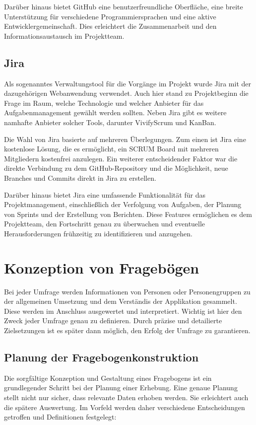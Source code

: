 Darüber hinaus bietet GitHub eine benutzerfreundliche Oberfläche, eine breite Unterstützung
für verschiedene Programmiersprachen und eine aktive Entwicklergemeinschaft. Dies erleichtert
die Zusammenarbeit und den Informationsaustausch im Projektteam.

\subsection{Jira}
Als sogenanntes Verwaltungstool für die Vorgänge im Projekt wurde Jira mit der dazugehörigen
Webanwendung verwendet. Auch hier stand zu Projektbeginn die Frage im Raum, welche Technologie
und welcher Anbieter für das Aufgabenmanagement gewählt werden sollten. Neben Jira gibt es
weitere namhafte Anbieter solcher Tools, darunter VivifyScrum und KanBan.

Die Wahl von Jira basierte auf mehreren Überlegungen. Zum einen ist Jira eine kostenlose
Lösung, die es ermöglicht, ein SCRUM Board mit mehreren Mitgliedern kostenfrei anzulegen.
Ein weiterer entscheidender Faktor war die direkte Verbindung zu dem GitHub-Repository und die Möglichkeit,
neue Branches und Commits direkt in Jira zu erstellen.

Darüber hinaus bietet Jira eine umfassende Funktionalität für das Projektmanagement, einschließlich
der Verfolgung von Aufgaben, der Planung von Sprints und der Erstellung von Berichten. Diese Features
ermöglichen es dem Projektteam, den Fortschritt genau zu überwachen und eventuelle Herausforderungen
frühzeitig zu identifizieren und anzugehen.

\section{Konzeption von Fragebögen}
Bei jeder Umfrage werden Informationen von Personen oder Personengruppen zu der allgemeinen
Umsetzung und dem Verständis der Applikation gesammelt. Diese werden im Anschluss ausgewertet und
interpretiert. Wichtig ist hier den Zweck jeder Umfrage genau zu definieren. Durch präzise und
detailierte Zielsetzungen ist es später dann möglich, den Erfolg der Umfrage zu garantieren.

\subsection{Planung der Fragebogenkonstruktion}

Die sorgfältige Konzeption und Gestaltung eines Fragebogens ist ein grundlegender Schritt bei der Planung einer Erhebung.
Eine genaue Planung stellt nicht nur sicher, dass relevante Daten erhoben werden. Sie erleichtert auch die spätere
Auswertung. Im Vorfeld werden daher verschiedene Entscheidungen getroffen und Definitionen festgelegt:

